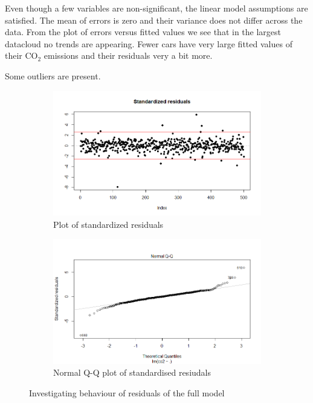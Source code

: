 \documentclass[12pt]{article}
\begin{document}
Even though a few variables are non-significant, the linear model assumptions are satisfied. The mean of errors is zero
and their variance does not differ across the data. From the plot of errors versus fitted values we see that in the largest datacloud no trends
are appearing. Fewer cars have very large fitted values of their $\text{CO}_2$ emissions and their residuals very a bit more.

Some outliers are present.

\begin{figure}[h]
  \begin{subfigure}[b]{0.5\linewidth}
      \centering
      \includegraphics[width=\textwidth]{project3/cars.full.res.png}
      \caption{Plot of standardized residuals}
      \label{fig:cars.full.res}
  \end{subfigure}%
  \begin{subfigure}[b]{0.5\linewidth}
      \centering
   \includegraphics[width=\textwidth]{project3/QQ_cars.full.res.png}
   \caption{Normal Q-Q plot of standardised resiudals}\label{fig:QQ_cars.full}
  \end{subfigure}%
 \caption{Investigating behaviour of residuals of the full model}
\end{figure}
\end{document}
